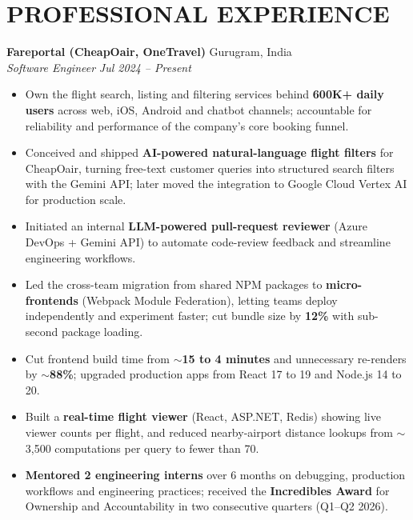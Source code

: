 \documentclass[a4paper,10pt]{extarticle}
\newcommand{\resumeSubheading}[4]{%
    \textbf{#1} \hfill #2\\
    \textit{#3} \hfill \textit{#4}}
\begin{document}
\section*{PROFESSIONAL EXPERIENCE}

\resumeSubheading
{Fareportal (CheapOair, OneTravel)}
{Gurugram, India}
{Software Engineer}
{Jul 2024 -- Present}

\begin{itemize}
    \item Own the flight search, listing and filtering services behind \textbf{600K+ daily users}
    across web, iOS, Android and chatbot channels; accountable for reliability and performance of the
    company's core booking funnel. %

    \item Conceived and shipped \textbf{AI-powered natural-language flight filters} for CheapOair, turning
    free-text customer queries into structured search filters with the Gemini API; later moved the
    integration to Google Cloud Vertex AI for production scale.

    \item Initiated an internal \textbf{LLM-powered pull-request reviewer} (Azure DevOps + Gemini API)
    to automate code-review feedback and streamline engineering workflows. %

    \item Led the cross-team migration from shared NPM packages to \textbf{micro-frontends} (Webpack
    Module Federation), letting teams deploy independently and experiment faster; cut bundle size by
    \textbf{12\%} with sub-second package loading.

    \item Cut frontend build time from \textbf{${\sim}$15 to 4 minutes} and unnecessary re-renders by
    \textbf{${\sim}$88\%}; upgraded production apps from React 17 to 19 and Node.js 14 to 20.

    \item Built a \textbf{real-time flight viewer} (React, ASP.NET, Redis) showing live viewer counts per
    flight, and reduced nearby-airport distance lookups from ${\sim}$3,500 computations per query to
    fewer than 70.

    \item \textbf{Mentored 2 engineering interns} over 6 months on debugging, production workflows and
    engineering practices; received the \textbf{Incredibles Award} for Ownership and Accountability in
    two consecutive quarters (Q1--Q2 2026).
\end{itemize}
\end{document}
